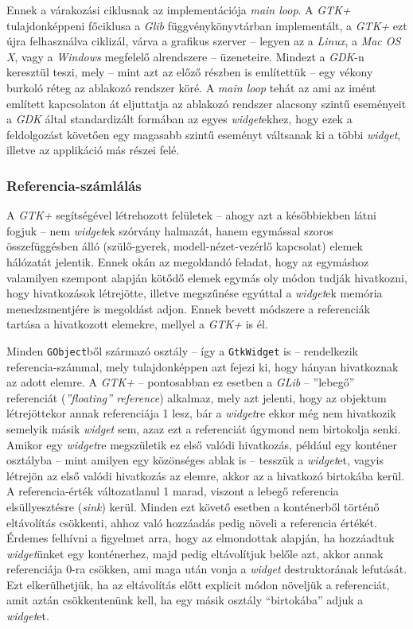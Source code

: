 Ennek a várakozási ciklusnak az implementációja \textit{main loop}. A \textit{GTK+} tulajdonképpeni főciklusa a \textit{Glib} függvénykönyvtárban implementált, a \textit{GTK+} ezt újra felhasználva ciklizál, várva a grafikus szerver -- legyen az a \textit{Linux}, a \textit{Mac OS X}, vagy a \textit{Windows} megfelelő alrendszere -- üzeneteire. Mindezt a \textit{GDK}-n keresztül teszi, mely -- mint azt az előző részben is említettük -- egy vékony burkoló réteg az ablakozó rendszer köré. A \textit{main loop} tehát az ami az imént említett kapcsolaton át eljuttatja az ablakozó rendszer alacsony szintű eseményeit a \textit{GDK} által standardizált formában az egyes \textit{widget}ekhez, hogy ezek a feldolgozást követően egy magasabb szintű eseményt váltsanak ki a többi \textit{widget}, illetve az applikáció más részei felé.

\subsubsection{Referencia-számlálás}

A \textit{GTK+} segítségével létrehozott felületek -- ahogy azt a későbbiekben látni fogjuk -- nem \textit{widget}ek szórvány halmazát, hanem egymással szoros összefüggésben álló (szülő-gyerek, modell-nézet-vezérlő kapcsolat) elemek hálózatát jelentik. Ennek okán az megoldandó feladat, hogy az egymáshoz valamilyen szempont alapján kötődő elemek egymás oly módon tudják hivatkozni, hogy hivatkozások létrejötte, illetve megszűnése egyúttal a \textit{widget}ek memória menedzsmentjére is megoldást adjon. Ennek bevett módszere a referenciák tartása a hivatkozott elemekre, mellyel a \textit{GTK+} is él.

Minden \texttt{GObject}ből származó osztály -- így a \texttt{GtkWidget} is -- rendelkezik referencia-számmal, mely tulajdonképpen azt fejezi ki, hogy hányan hivatkoznak az adott elemre. A \textit{GTK+} -- pontosabban ez esetben a \textit{GLib} -- ''lebegő'' referenciát (\textit{''floating'' reference}) alkalmaz, mely azt jelenti, hogy az objektum létrejöttekor annak referenciája 1 lesz, bár a \textit{widget}re ekkor még nem hivatkozik semelyik másik \textit{widget} sem, azaz ezt a referenciát úgymond nem birtokolja senki. Amikor egy \textit{widget}re megszületik ez első valódi hivatkozás, például egy konténer osztályba -- mint amilyen egy közönséges ablak is -- tesszük a \textit{widget}et, vagyis létrejön az első valódi hivatkozás az elemre, akkor az a hivatkozó birtokába kerül. A referencia-érték változatlanul 1 marad, viszont a lebegő referencia elsüllyesztésre (\textit{sink}) kerül. Minden ezt követő esetben a konténerből történő eltávolítás csökkenti, ahhoz való hozzáadás pedig növeli a referencia értékét. Érdemes felhívni a figyelmet arra, hogy az elmondottak alapján, ha hozzáadtuk \textit{widget}ünket egy konténerhez, majd pedig eltávolítjuk belőle azt, akkor annak referenciája 0-ra csökken, ami maga után vonja a \textit{widget} destruktorának lefutását. Ezt elkerülhetjük, ha az eltávolítás előtt explicit módon növeljük a referenciát, amit aztán csökkentenünk kell, ha egy másik osztály ``birtokába'' adjuk a \textit{widget}et.

